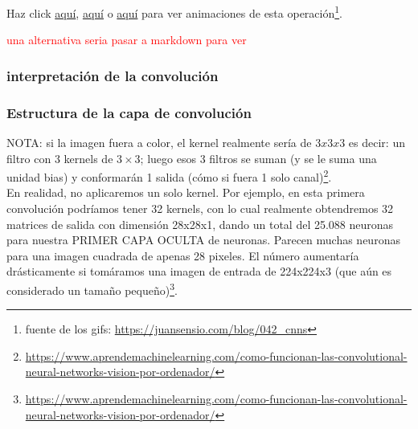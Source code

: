 \documentclass{article}
\begin{document}
Haz click \href{https://miro.medium.com/max/1052/1*GcI7G-JLAQiEoCON7xFbhg.gif}{aquí}, \href{https://cdn-media-1.freecodecamp.org/images/gb08-2i83P5wPzs3SL-vosNb6Iur5kb5ZH43}{aquí} o \href{https://thumbs.gfycat.com/AffectionateMemorableGreyhounddog-size_restricted.gif}{aquí} para ver animaciones de esta operación\footnote{fuente de los gifs: \url{https://juansensio.com/blog/042_cnns}}.

\textcolor{red}{una alternativa seria pasar a markdown para ver }\\





\subsubsection{interpretación de la convolución}


\subsubsection{Estructura de la capa de convolución}

NOTA: si la imagen fuera a color, el kernel realmente sería de $3x3x3$ es decir: un filtro con 3 kernels de $3\times3$; luego  esos 3 filtros se suman (y se le suma una unidad bias) y conformarán 1 salida (cómo si fuera 1 solo canal)\footnote{\url{https://www.aprendemachinelearning.com/como-funcionan-las-convolutional-neural-networks-vision-por-ordenador/}}.\\

En realidad, no aplicaremos un solo kernel. Por ejemplo, en esta primera convolución podríamos tener 32 kernels, con lo cual realmente obtendremos 32 matrices de salida con dimensión 28x28x1, dando un total del 25.088 neuronas para nuestra PRIMER CAPA OCULTA de neuronas. Parecen muchas neuronas para una imagen cuadrada de apenas 28 pixeles. El número aumentaría drásticamente si tomáramos una imagen de entrada de 224x224x3 (que aún es considerado un tamaño pequeño)\footnote{\url{https://www.aprendemachinelearning.com/como-funcionan-las-convolutional-neural-networks-vision-por-ordenador/}}.\\
\end{document}
